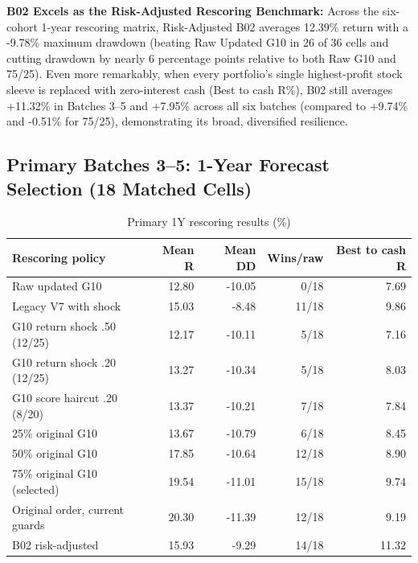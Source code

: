 \documentclass[11pt,a4paper]{article}
\numberwithin{table}{section}
\begin{document}
\textbf{B02 Excels as the Risk-Adjusted Rescoring Benchmark:}  Across the six-cohort 1-year rescoring matrix, Risk-Adjusted B02 averages 12.39\% return with a -9.78\% maximum drawdown (beating Raw Updated G10 in 26 of 36 cells and cutting drawdown by nearly 6 percentage points relative to both Raw G10 and 75/25). Even more remarkably, when every portfolio's single highest-profit stock sleeve is replaced with zero-interest cash (Best to cash R\%), B02 still averages +11.32\% in Batches 3--5 and +7.95\% across all six batches (compared to +9.74\% and -0.51\% for 75/25), demonstrating its broad, diversified resilience.

\subsection{Primary Batches 3--5: 1-Year Forecast Selection (18 Matched Cells)}

\begin{minipage}{\linewidth}
\begin{center}\small\setlength{\tabcolsep}{3pt}\renewcommand{\arraystretch}{1.18}
\begin{longtable}{@{}p{.43\linewidth}rrrr@{}}
\caption{Primary 1Y rescoring results (\%)}\\
\toprule
Rescoring policy & Mean R & Mean DD & Wins/raw & Best to cash R\\\midrule\endhead
Raw updated G10 & 12.80 & -10.05 & 0/18 & 7.69\\
Legacy V7 with shock & 15.03 & -8.48 & 11/18 & 9.86\\
G10 return shock .50 (12/25) & 12.17 & -10.11 & 5/18 & 7.16\\
G10 return shock .20 (12/25) & 13.27 & -10.34 & 5/18 & 8.03\\
G10 score haircut .20 (8/20) & 13.37 & -10.21 & 7/18 & 7.84\\
25\% original G10 & 13.67 & -10.79 & 6/18 & 8.45\\
50\% original G10 & 17.85 & -10.64 & 12/18 & 8.90\\
75\% original G10 (selected) & 19.54 & -11.01 & 15/18 & 9.74\\
Original order, current guards & 20.30 & -11.39 & 12/18 & 9.19\\
B02 risk-adjusted & 15.93 & -9.29 & 14/18 & 11.32\\
\bottomrule\end{longtable}\end{center}
\end{minipage}\par
\end{document}
